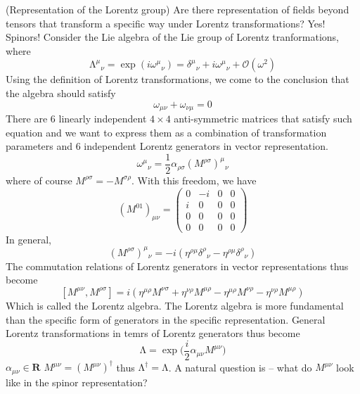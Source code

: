 \begin{defi}
(Representation of the Lorentz group) Are there representation of fields beyond tensors that transform a specific way under Lorentz transformations? Yes! Spinors! Consider the Lie algebra of the Lie group of Lorentz tranformations, where
	\[\mathrm{\Lambda }^{\mu }{}_{\nu }=\exp (i\omega ^{\mu }{}_{\nu })=\delta ^{\mu }{}_{\nu }+i\omega ^{\mu }{}_{\nu }+\mathcal{O}(\omega ^2)\]
Using the definition of Lorentz transformations, we come to the conclusion that the algebra should satisfy
\[\omega _{\mu \nu }+\omega _{\nu \mu }=0\]
There are 6 linearly independent $4\times 4$ anti-symmetric matrices that satisfy such equation and we want to express them as a combination of transformation parameters and 6 independent Lorentz generators in vector representation.
	\[\omega ^{\mu }{}_{\nu }=\dfrac{1}{2}\alpha _{\rho \sigma }(M^{\rho \sigma })^{\mu }{}_{\nu }\]
where of course $M^{\rho \sigma }=-M^{\sigma \rho }$. With this freedom, we have
\[
(M^{01})_{\mu \nu }=\begin{pmatrix}
	0&-i&0&0\\i&0&0&0\\0&0&0&0\\0&0&0&0
\end{pmatrix}
\]
In general,
	\[(M^{\rho \sigma })^{\mu }{}_{\nu }=-i(\eta ^{\rho \mu }\delta ^{\rho }{}_{\nu }-\eta ^{\rho \mu }\delta ^{\rho }{}_{\nu })\]
The commutation relations of Lorentz generators in vector representations thus become
	\[[M^{\mu \nu },M^{\rho \sigma }]=i(\eta ^{\mu \rho }M^{\nu \sigma }+\eta ^{\nu \rho }M^{\mu \rho }-\eta ^{\mu \rho }M^{\nu \rho }-\eta^{\nu \rho }M^{\mu \rho })\]
Which is called the Lorentz algebra. The Lorentz algebra is more fundamental than the specific form of generators in the specific representation. General Lorentz transformations in temrs of Lorentz generators thus become
\[\mathrm{\Lambda }=\exp \Big(\dfrac{i}{2}\alpha _{\mu \nu }M^{\mu \nu }\Big)\]
	$\alpha _{\mu \nu }\in {\bm R}$ $M^{\mu \nu }=(M^{\mu \nu })^{\dagger}$ thus $\mathrm{\Lambda }^{\dagger}=\mathrm{\Lambda }$. A natural question is -- what do $M^{\mu \nu }$ look like in the spinor representation?
\end{defi}



\vspace{2ex}
